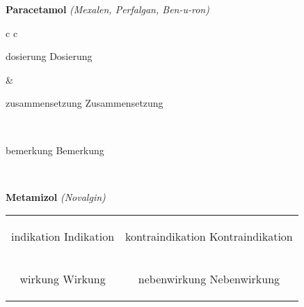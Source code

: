 \documentclass[12pt]{beamer}
\begin{document}
\begin{frame}{
    \textbf{Paracetamol}
    \textit{(Mexalen, Perfalgan, Ben-u-ron)}
}
    \begin{tabular}{c c}
        \begin{beamercolorbox}[wd=\boxwidth\textwidth,ht=\boxheight\textheight,sep=1em]{dosierung}
        Dosierung
        \end{beamercolorbox} & 
        \begin{beamercolorbox}[wd=\boxwidth\textwidth,ht=\boxheight\textheight,sep=1em]{zusammensetzung}
        Zusammensetzung
        \end{beamercolorbox} \\
        \begin{beamercolorbox}[wd=\textwidth,ht=\boxheight\textheight,sep=1em]{bemerkung}
        Bemerkung
        \end{beamercolorbox} \\
    \end{tabular}
\end{frame}

\begin{frame}{
    \textbf{Metamizol}
    \textit{(Novalgin)}
}
    \begin{tabular}{c c}
        \begin{beamercolorbox}[wd=\boxwidth\textwidth,ht=\boxheight\textheight,sep=1em]{indikation}
        Indikation
        \end{beamercolorbox} & 
        \begin{beamercolorbox}[wd=\boxwidth\textwidth,ht=\boxheight\textheight,sep=1em]{kontraindikation}
        Kontraindikation 
        \end{beamercolorbox} \\
        \begin{beamercolorbox}[wd=\boxwidth\textwidth,ht=\boxheight\textheight,sep=1em]{wirkung}
        Wirkung
        \end{beamercolorbox} & 
        \begin{beamercolorbox}[wd=\boxwidth\textwidth,ht=\boxheight\textheight,sep=1em]{nebenwirkung}
        Nebenwirkung
        \end{beamercolorbox} \\
    \end{tabular}
\end{frame}
\end{document}
